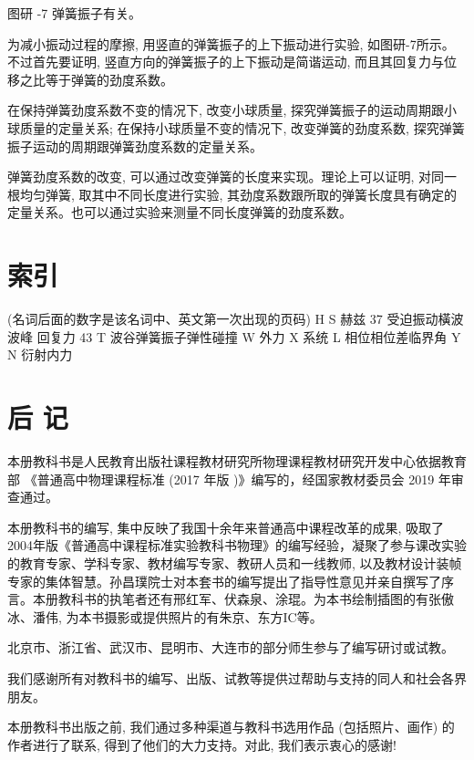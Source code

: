\documentclass[10pt]{article}
\begin{document}
\begin{mdframed}

图研 -7 弹簧振子有关。

\end{mdframed}

为减小振动过程的摩擦, 用竖直的弹簧振子的上下振动进行实验, 如图研-7所示。不过首先要证明, 竖直方向的弹簧振子的上下振动是简谐运动, 而且其回复力与位移之比等于弹簧的劲度系数。

在保持弹簧劲度系数不变的情况下, 改变小球质量, 探究弹簧振子的运动周期跟小球质量的定量关系; 在保持小球质量不变的情况下, 改变弹簧的劲度系数, 探究弹簧振子运动的周期跟弹簧劲度系数的定量关系。

弹簧劲度系数的改变, 可以通过改变弹簧的长度来实现。理论上可以证明, 对同一根均匀弹簧, 取其中不同长度进行实验, 其劲度系数跟所取的弹簧长度具有确定的定量关系。也可以通过实验来测量不同长度弹簧的劲度系数。

\section*{索引}

(名词后面的数字是该名词中、英文第一次出现的页码) H S 赫兹 37 受迫振动橫波波峰 回复力 43 T 波谷弹簧振子弹性碰撞 W 外力 X 系统 L 相位相位差临界角 Y N 衍射内力

\section*{后 记}

本册教科书是人民教育出版社课程教材研究所物理课程教材研究开发中心依据教育部 《普通高中物理课程标准 (2017 年版 )》编写的，经国家教材委员会 2019 年审查通过。

本册教科书的编写, 集中反映了我国十余年来普通高中课程改革的成果, 吸取了 2004年版《普通高中课程标准实验教科书物理》的编写经验，凝聚了参与课改实验的教育专家、学科专家、教材编写专家、教研人员和一线教师, 以及教材设计装帧专家的集体智慧。孙昌璞院士对本套书的编写提出了指导性意见并亲自撰写了序言。本册教科书的执笔者还有邢红军、伏森泉、涂琨。为本书绘制插图的有张傲冰、潘伟, 为本书摄影或提供照片的有朱京、东方IC等。

北京市、浙江省、武汉市、昆明市、大连市的部分师生参与了编写研讨或试教。

我们感谢所有对教科书的编写、出版、试教等提供过帮助与支持的同人和社会各界朋友。

本册教科书出版之前, 我们通过多种渠道与教科书选用作品 (包括照片、画作) 的作者进行了联系, 得到了他们的大力支持。对此, 我们表示衷心的感谢!
\end{document}
